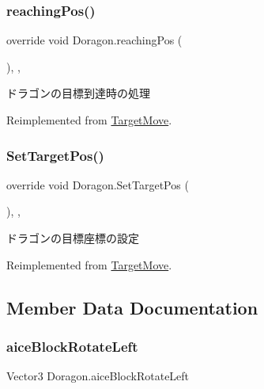 \subsubsection{\texorpdfstring{reaching\+Pos()}{reachingPos()}}
{\footnotesize\ttfamily override void Doragon.\+reaching\+Pos (\begin{DoxyParamCaption}{ }\end{DoxyParamCaption})\hspace{0.3cm}{\ttfamily [inline]}, {\ttfamily [protected]}, {\ttfamily [virtual]}}



ドラゴンの目標到達時の処理 



Reimplemented from \hyperlink{class_target_move_aaac3d0086f68958d440f2131559894f2}{Target\+Move}.

\mbox{\label{class_doragon_ada19292614ee1a706b373875fab11a01}} 
\subsubsection{\texorpdfstring{Set\+Target\+Pos()}{SetTargetPos()}}
{\footnotesize\ttfamily override void Doragon.\+Set\+Target\+Pos (\begin{DoxyParamCaption}{ }\end{DoxyParamCaption})\hspace{0.3cm}{\ttfamily [inline]}, {\ttfamily [protected]}, {\ttfamily [virtual]}}



ドラゴンの目標座標の設定 



Reimplemented from \hyperlink{class_target_move_a72a50d04fd830edcb8ae5d3b63c3cc36}{Target\+Move}.



\subsection{Member Data Documentation}
\mbox{\label{class_doragon_aaba104d1d08e2b4a5203fa89b434623b}} 
\subsubsection{\texorpdfstring{aice\+Block\+Rotate\+Left}{aiceBlockRotateLeft}}
{\footnotesize\ttfamily Vector3 Doragon.\+aice\+Block\+Rotate\+Left\hspace{0.3cm}{\ttfamily [private]}}



